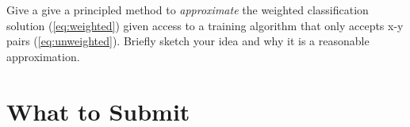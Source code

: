 \documentclass[11pt]{article}
\begin{document}
{\begin{enumerate}[(1)]
Give a give a principled method to \emph{approximate} the weighted
classification solution (\ref{eq:weighted}) given access to a training algorithm
that only accepts x-y pairs (\ref{eq:unweighted}).  Briefly sketch your idea and
why it is a reasonable approximation.

  \begin{answertext}{13cm}{}

  \end{answertext}

\end{enumerate}

}

\newpage
\section{What to Submit}
\end{document}
